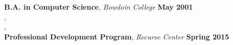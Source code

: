 \textbf{B.A. in Computer Science}, \textit{Bowdoin College} \hfill \textbf{May 2001}\\
\vspace{0.2em}
\textbf{}, \textit{} \hfill \textbf{}\\
\vspace{0.2em}
\textbf{}, \textit{} \hfill \textbf{}\\
\vspace{0.2em}
\textbf{Professional Development Program}, \textit{Recurse Center} \hfill \textbf{Spring 2015}\\
\vspace{0.2em}

